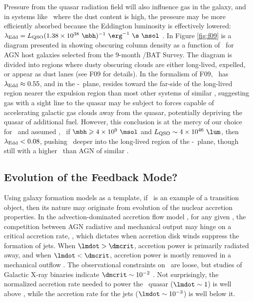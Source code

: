 \documentclass[useAMS,usenatbib]{mn2e}
\begin{document}
Pressure from the quasar radiation field will also influence gas in
the galaxy, and in systems like \irs\ where the dust content is high,
the pressure may be more efficiently absorbed because the Eddington
luminosity is effectively lowered: $\leff = \lqso (1.38 \times 10^{38}
~\mbh)^{-1} ~\erg^{-1} ~\s ~\msol$
\citep[\eg][]{1993ApJ...402..441L}. In Figure \ref{fig:f09} is a
diagram presented in \citet[][hereafter F09]{2009MNRAS.394L..89F}
showing obscuring column density as a function of \leff\ for AGN host
galaxies selected from the 9-month \swift/BAT Survey. The diagram is
divided into regions where dusty obscuring clouds are either
long-lived, expelled, or appear as dust lanes (see F09 for
details). In the formalism of F09, \irs\ has $\lambda_{\rm{Edd}} \approx 0.55$, and
in the \nhobs-\leff\ plane, resides toward the far-side of the
long-lived region nearer the expulsion region than most other systems
of similar \nhobs, suggesting gas with a sight line to the quasar may
be subject to forces capable of accelerating galactic gas clouds away
from the quasar, potentially depriving the quasar of additional
fuel. However, this conclusion is at the mercy of our choice for
\mbh\ and assumed \lqso, \ie\ if $\mbh \ge 4 \times 10^9 ~\msol$ and
$\lqso \sim 4 \times 10^{46} ~\lum$, then $\lambda_{\rm{Edd}} < 0.08$, pushing
\irs\ deeper into the long-lived region of the \nhobs-\leff\ plane,
though still with a higher \leff\ than AGN of similar \nhobs.

\subsection{Evolution of the Feedback Mode?}

Using galaxy formation models as a template, if \irs\ is an example of
a transition object, then its nature may originate from evolution of
the nuclear accretion properties. In the advection-dominated accretion
flow model \citep{adaf}, for any given \mbh, the competition between
AGN radiative and mechanical output may hinge on a critical accretion
rate, \dmcrit, which dictates when accretion disk winds suppress the
formation of jets. When $\lmdot > \dmcrit$, accretion power is
primarily radiated away, and when $\lmdot < \dmcrit$, accretion power
is mostly removed in a mechanical outflow
\citep{1997ApJ...489..865E}. The observational constraints on
\dmcrit\ are loose, but studies of Galactic X-ray binaries indicate
$\dmcrit \sim 10^{-2}$ \citep[\eg][]{2003MNRAS.344...60G,
  2008NewAR..51..733N}. Not surprisingly, the normalized accretion
rate needed to power the \irs\ quasar ($\lmdot \sim 1$) is well above
\dmcrit, while the accretion rate for the jets ($\lmdot \sim 10^{-3}$)
is well below it.
\end{document}
